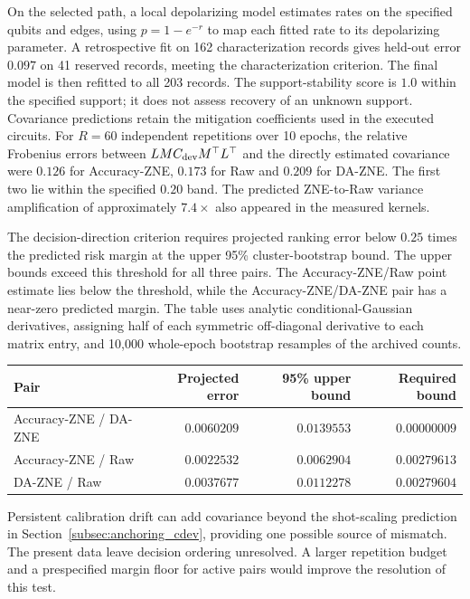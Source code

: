 \documentclass[a4paper,onecolumn,unpublished,nopdfoutputerror]{quantumarticle}
\theoremstyle{plain}
\theoremstyle{definition}
\newcommand{\1}{\mathbf{1}}
\begin{document}
On the selected path, a local depolarizing model estimates rates on the specified qubits and edges, using $p=1-e^{-r}$ to map each fitted rate to its depolarizing parameter. A retrospective fit on 162 characterization records gives held-out error $0.097$ on 41 reserved records, meeting the characterization criterion. The final model is then refitted to all 203 records. The support-stability score is $1.0$ within the specified support; it does not assess recovery of an unknown support. Covariance predictions retain the mitigation coefficients used in the executed circuits. For $R=60$ independent repetitions over 10 epochs, the relative Frobenius errors between $LMC_{\rm dev}M^\top L^\top$ and the directly estimated covariance were $0.126$ for Accuracy-ZNE, $0.173$ for Raw and $0.209$ for DA-ZNE. The first two lie within the specified $0.20$ band. The predicted ZNE-to-Raw variance amplification of approximately $7.4\times$ also appeared in the measured kernels.

The decision-direction criterion requires projected ranking error below $0.25$ times the predicted risk margin at the upper 95\% cluster-bootstrap bound. The upper bounds exceed this threshold for all three pairs. The Accuracy-ZNE/Raw point estimate lies below the threshold, while the Accuracy-ZNE/DA-ZNE pair has a near-zero predicted margin. The table uses analytic conditional-Gaussian derivatives, assigning half of each symmetric off-diagonal derivative to each matrix entry, and 10,000 whole-epoch bootstrap resamples of the archived counts.

\begin{center}\small
\begin{tabular}{lrrr}\toprule
Pair & Projected error & 95\% upper bound & Required bound\\\midrule
Accuracy-ZNE / DA-ZNE & $0.0060209$ & $0.0139553$ & $0.00000009$ \\
Accuracy-ZNE / Raw & $0.0022532$ & $0.0062904$ & $0.00279613$ \\
DA-ZNE / Raw & $0.0037677$ & $0.0112278$ & $0.00279604$ \\
\bottomrule\end{tabular}\end{center}

Persistent calibration drift can add covariance beyond the shot-scaling prediction in Section~\ref{subsec:anchoring_cdev}, providing one possible source of mismatch. The present data leave decision ordering unresolved. A larger repetition budget and a prespecified margin floor for active pairs would improve the resolution of this test.
\end{document}
